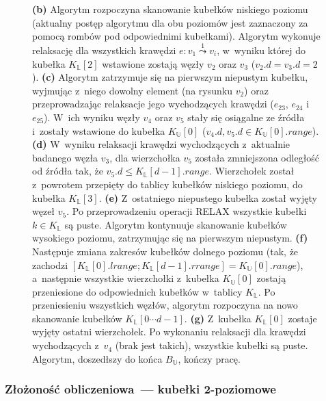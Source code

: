 \begin{figure}[!htbp]
	\caption{ \textbf{(b)} Algorytm rozpoczyna skanowanie kubełków niskiego poziomu (aktualny postęp algorytmu dla obu poziomów jest zaznaczony za pomocą rombów pod odpowiednimi kubełkami). Algorytm wykonuje relaksację dla wszystkich krawędzi $e : v_{1} \overset{1}\leadsto v_{i}$, w~wyniku której do kubełka $K_{\mathbb{L}} \left[ 2\right]$ wstawione zostają węzły $v_{2}$ oraz $v_{3}$ ($v_{2}.d = v_{3}.d = 2$). \textbf{(c)} Algorytm zatrzymuje się na pierwszym niepustym kubełku, wyjmując z~niego dowolny element (na rysunku $v_{2}$) oraz przeprowadzając relaksacje jego wychodzących krawędzi ($e_{23}$, $e_{24}$ i~$e_{25}$). W~ich wyniku węzły $v_{4}$ oraz $v_{5}$ stały się osiągalne ze źródła i~zostały wstawione do kubełka $K_{\mathbb{U}} \left[ 0 \right]$ ($v_{4}.d, v_{5}.d \in K_{\mathbb{U}} \left[ 0 \right].range$). \textbf{(d)} W~wyniku relaksacji krawędzi wychodzących z~aktualnie badanego węzła $v_{3}$, dla wierzchołka $v_{5}$ została zmniejszona odległość od źródła tak, że $v_{5}.d \leqslant K_{\mathbb{L}} \left[ d - 1 \right].range$. Wierzchołek został z~powrotem przepięty do tablicy kubełków niskiego poziomu, do kubełka $K_{\mathbb{L}} \left[ 3 \right]$. \textbf{(e)} Z~ostatniego niepustego kubełka został wyjęty węzeł $v_{5}$. Po przeprowadzeniu operacji \textsc{RELAX} wszystkie kubełki $k \in K_{\mathbb{L}}$ są puste. Algorytm kontynuuje skanowanie kubełków wysokiego poziomu, zatrzymując się na pierwszym niepustym. \textbf{(f)} Następuje zmiana zakresów kubełków dolnego poziomu (tak, że zachodzi $ \left[ K_{\mathbb{L}} \left[ 0 \right].lrange ; K_{\mathbb{L}} \left[ d - 1 \right].rrange \right] = K_{\mathbb{U}} \left[ 0 \right].range$), a~następnie wszystkie wierzchołki z~kubełka $K_{\mathbb{U}} \left[ 0 \right]$ zostają przeniesione do odpowiednich kubełków w~tablicy $K_{\mathbb{L}}$. Po przeniesieniu wszystkich węzłów, algorytm rozpoczyna na nowo skanowanie kubełków $K_{\mathbb{L}} \left[ 0 \cdots d-1 \right]$. \textbf{(g)} Z~kubełka $K_{\mathbb{L}} \left[ 0 \right]$ zostaje wyjęty ostatni wierzchołek. Po wykonaniu relaksacji dla krawędzi wychodzących z~$v_{4}$ (brak jest takich), wszystkie kubełki są puste. Algorytm, doszedłszy do końca $B_{\mathbb{U}}$, kończy pracę.} \label{fig:exampleDoubleLevelBuckets2}
\end{figure}

\subsubsection{Złożoność obliczeniowa~--- kubełki 2-poziomowe}

